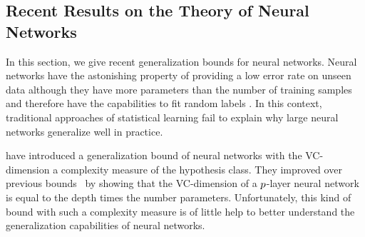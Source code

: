 

\subsection{Recent Results on the Theory of Neural Networks}
\label{subsection:ch2-recent_results_on_the_theory_of_neural_networks}

In this section, we give recent generalization bounds for neural networks.
Neural networks have the astonishing property of providing a low error rate on unseen data although they have more parameters than the number of training samples and therefore have the capabilities to fit random labels \cite{zhang2016understanding}.
In this context, traditional approaches of statistical learning  fail to explain why large neural networks generalize well in practice.

\citet{harvey2017nearly} have introduced a generalization bound of neural networks with the VC-dimension a complexity measure of the hypothesis class.
They improved over previous bounds~\cite{bartlett1998almost,anthony1999neural} by showing that the VC-dimension of a $p$-layer neural network is equal to the depth times the number parameters.
Unfortunately, this kind of bound with such a complexity measure is of little help to better understand the generalization capabilities of neural networks.

